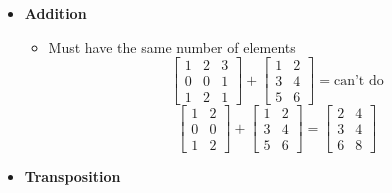\begin{itemize}
    
    \item \textbf{Addition}
    
    \begin{itemize}
        \item Must have the same number of elements
        \begin{equation*}
            \begin{bmatrix}
                1 & 2 & 3 \\
                0 & 0 & 1 \\
                1 & 2 & 1
            \end{bmatrix} +
            \begin{bmatrix}
                1 & 2 \\
                3 & 4 \\
                5 & 6
            \end{bmatrix} = \text{can't do}
        \end{equation*}
        \begin{equation*}
            \begin{bmatrix}
                1 & 2 \\
                0 & 0 \\
                1 & 2
            \end{bmatrix} + 
            \begin{bmatrix}
                1 & 2 \\
                3 & 4 \\
                5 & 6
            \end{bmatrix} =
            \begin{bmatrix}
                2 & 4 \\
                3 & 4 \\
                6 & 8
            \end{bmatrix}
        \end{equation*}
    \end{itemize}

    \item \textbf{Transposition}
    

\end{itemize}
